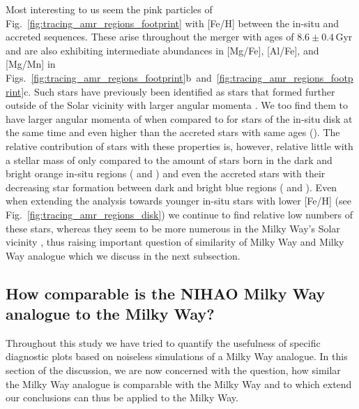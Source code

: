 \documentclass[fleqn,usenatbib]{mnras}
\begin{document}
Most interesting to us seem the pink particles of Fig.~\ref{fig:tracing_amr_regions_footprint} with [Fe/H] between the in-situ and accreted sequences. These arise throughout the merger with ages of $8.6\pm0.4\,\mathrm{Gyr}$ and are also exhibiting intermediate abundances in [Mg/Fe], [Al/Fe], and [Mg/Mn] in Figs.~\ref{fig:tracing_amr_regions_footprint}b~and~\ref{fig:tracing_amr_regions_footprint}c. Such stars have previously been identified as stars that formed further outside of the Solar vicinity  with larger angular momenta \citep[e.g.][]{Haywood2008b, Haywood2013, Buder2019}. We too find them to have larger angular momenta of  when compared to  for stars of the in-situ disk at the same time and even higher than the accreted stars with same ages (). The relative contribution of stars with these properties is, however, relative little with a stellar mass of only  compared to the amount of stars born in the dark and bright orange in-situ regions ( and ) and even the accreted stars with their decreasing star formation between dark and bright blue regions ( and ). Even when extending the analysis towards younger in-situ stars with lower [Fe/H] (see Fig.~\ref{fig:tracing_amr_regions_disk}) we continue to find relative low numbers of these stars, whereas they seem to be more numerous in the Milky Way's Solar vicinity \citep{Haywood2013, Hayden2015, Buder2019}, thus raising important question of similarity of Milky Way and Milky Way analogue which we discuss in the next subsection.

\subsection{How comparable is the NIHAO Milky Way analogue to the Milky Way?} \label{sec:discussion_how_comparable_are_nihao_and_milkyway}

Throughout this study we have tried to quantify the usefulness of specific diagnostic plots based on noiseless simulations of a Milky Way analogue. In this section of the discussion, we are now concerned with the question, how similar the Milky Way analogue is comparable with the Milky Way and to which extend our conclusions can thus be applied to the Milky Way.
\end{document}
